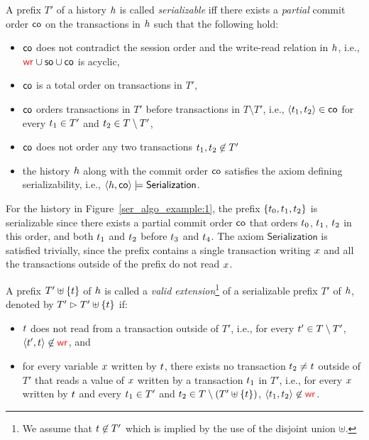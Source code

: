 
A prefix $T'$ of a history ${h}$ is called \emph{serializable} iff there exists a \emph{partial} commit order $\mathsf{co}$ on the transactions in ${h}$ such that the following hold:
\begin{itemize}
  \item $\mathsf{co}$ does not contradict the session order and the write-read relation in ${h}$, i.e., $ \textcolor{red}{\mathsf{wr}_{}} \cup \mathsf{so}\cup \mathsf{co}$ is acyclic, 
 \item $\mathsf{co}$ is a total order on transactions in $T'$, 
 \item $\mathsf{co}$ orders transactions in $T'$ before transactions in $T\setminus T'$, i.e., ${\left\langle{{t}_1,{t}_2}\right\rangle}\in \mathsf{co}$ for every ${t}_1\in T'$ and ${t}_2\in T\setminus T'$,  
 \item $\mathsf{co}$ does not order any two transactions ${t}_1, {t}_2 \not\in T'$
 \item the history ${h}$ along with the commit order $\mathsf{co}$ satisfies the axiom defining serializability, i.e., ${\left\langle{{h}, \mathsf{co}}\right\rangle} \models \mathsf{Serialization}$.
\end{itemize}

For the history in Figure~\ref{ser_algo_example:1}, the prefix $\{{t}_0,{t}_1,{t}_2\}$ is serializable since there exists a partial commit order $\mathsf{co}$ that orders 
${t}_0$, ${t}_1$, ${t}_2$ in this order, and both ${t}_1$ and ${t}_2$ before ${t}_3$ and ${t}_4$. The axiom $\mathsf{Serialization}$ is satisfied trivially, since the prefix contains a single transaction writing ${x}$ and all the transactions outside of the prefix do not read ${x}$.



A prefix $T'\uplus\{{t}\}$ of ${h}$ is called a \emph{valid extension}\footnote{We assume that ${t}\not\in T'$ which is implied by the use of the disjoint union $\uplus$.} of a serializable prefix $T'$ of ${h}$, denoted by $T'\vartriangleright T'\uplus\{{t}\}$%
if:
\begin{itemize}
 \item ${t}$ does not read from a transaction outside of $T'$, i.e., for every ${t}'\in T\setminus T'$, ${\left\langle{{t}',{t}}\right\rangle}\not\in\textcolor{red}{\mathsf{wr}_{}}$, and
 \item for every variable ${x}$ written by ${t}$, there exists no transaction ${t}_2\neq {t}$ outside of $T'$ that reads a value of ${x}$ written by a transaction ${t}_1$ in $T'$, i.e., for every ${x}$ written by ${t}$ and every ${t}_1\in T'$ and ${t}_2\in T\setminus (T'\uplus\{{t}\})$, ${\left\langle{{t}_1,{t}_2}\right\rangle}\not\in\textcolor{red}{\mathsf{wr}_{}}$.
\end{itemize}

